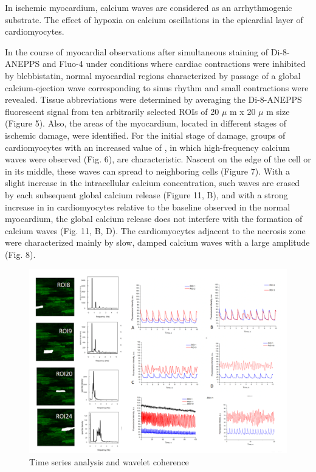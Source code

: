 \documentclass{biophys-new}
\begin{document}
In ischemic myocardium, calcium waves are considered as an arrhythmogenic substrate.
The effect of hypoxia on calcium oscillations in the epicardial layer of cardiomyocytes.


In the course of myocardial observations after simultaneous staining of Di-8-ANEPPS and Fluo-4 under conditions where cardiac contractions were inhibited by blebbistatin, normal myocardial regions characterized by passage of a global calcium-ejection wave corresponding to sinus rhythm and small contractions were revealed. Tissue abbreviations were determined by averaging the Di-8-ANEPPS fluorescent signal from ten arbitrarily selected ROIs of 20 $\mu$ m x 20 $\mu$ m size (Figure 5). Also, the areas of the myocardium, located in different stages of ischemic damage, were identified. For the initial stage of damage, groups of cardiomyocytes with an increased value of , in which high-frequency calcium waves were observed (Fig. 6), are characteristic. Nascent on the edge of the cell or in its middle, these waves can spread to neighboring cells (Figure 7). With a slight increase in the intracellular calcium concentration, such waves are erased by each subsequent global calcium release (Figure 11, B), and with a strong increase in  in cardiomyocytes relative to the baseline observed in the normal myocardium, the global calcium release does not interfere with the formation of calcium waves (Fig. 11, B, D). The cardiomyocytes adjacent to the necrosis zone were characterized mainly by slow, damped calcium waves with a large amplitude (Fig. 8).

\begin{figure}
    \includegraphics[width=0.8\linewidth]{fig4.png}
    \caption{Time series analysis and wavelet coherence}
    \label{fig:fig4}
\end{figure}
\end{document}

